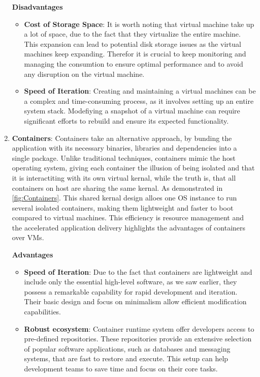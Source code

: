 \begin{enumerate}
          \textbf{Disadvantages}
          \begin{itemize}
              \item \textbf{Cost of Storage Space}: It is worth noting that virtual machine take up a lot of space, due to the fact that they virtualize the entire machine. This expansion can lead to potential disk storage issues as the virtual machines keep expanding. Therefor it is crucial to keep monitoring and managing the consumtion to ensure optimal performance and to avoid any disruption on the virtual machine.
              \item \textbf{Speed of Iteration}: Creating and maintaining a virtual machines can be a complex and time-consuming process, as it involves setting up an entire system stack. Modefiying a snapshot of a virtual machine can require significant efforts to rebuild and ensure its expected functionality.
          \end{itemize}
    \item \textbf{Containers}: Containers take an alternative approach, by bunding the application with its necessary binaries, libraries and dependencies into a single package. Unlike traditional techniques, containers mimic the host operating system, giving each container the illusion of being isolated and that it is interactiting with its own virtual kernal, while the truth is, that all containers on host are sharing the same kernal. As demonstrated in \autoref{fig:Containers}. This shared kernal design alloes one \ac{OS} instance to run several isolated containers, making them lightweight and faster to boot compared to virtual machines. This efficiency is resource management and the accelerated application delivery highlights the advantages of containers over \ac{VMs}.
          
          \newline
          \textbf{Advantages}
          \begin{itemize}
              \item \textbf{Speed of Iteration}: Due to the fact that containers are lightweight and include only the essential high-level software, as we saw earlier, they possess a remarkable capability for rapid development and iteration. Their basic design and focus on minimalism allow efficient modification capabilities.
              \item \textbf{Robust ecosystem}: Container runtime system offer developers access to pre-defined repositories. These repositories provide an extensive selection of popular software applications, such as databases and messaging systems, that are fast to restore and execute. This setup can help development teams to save time and focus on their core tasks.
          \end{itemize}


\end{enumerate}
